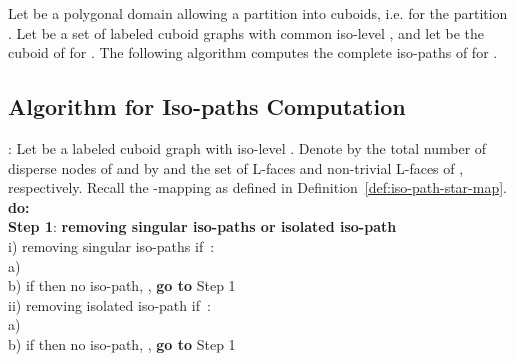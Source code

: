 \documentclass[a4paper,11pt]{article}
\begin{document}
Let  be a polygonal domain allowing a partition into cuboids,
i.e.  for the partition .  Let
 be a set of labeled cuboid graphs
with common iso-level , and let  be the cuboid of  for . The following
algorithm computes the complete iso-paths of  for .

\subsection*{Algorithm for Iso-paths Computation}
: Let  be a labeled cuboid graph with iso-level .
Denote by  the total number of disperse nodes of  and by  and  the set
of L-faces and non-trivial L-faces of , respectively. Recall the -mapping as defined in
Definition~\ref{def:iso-path-star-map}.\\

  {\bf do:}\\
\mbox{}\hspace{0.3cm}    {\bf Step 1}: {\bf removing singular iso-paths or isolated iso-path}\\
\mbox{}\hspace{0.6cm}      i) removing singular iso-paths if \,:\\
\mbox{}\hspace{1.1cm}         a) \\
\mbox{}\hspace{1.1cm}         b) if  then no iso-path, , {\bf go to} Step 1\\
\mbox{}\hspace{0.6cm}      ii) removing isolated iso-path if \,:\\
\mbox{}\hspace{1.1cm}         a) \\
\mbox{}\hspace{1.1cm}         b) if  then no iso-path, , {\bf go to} Step 1\\
\end{document}
